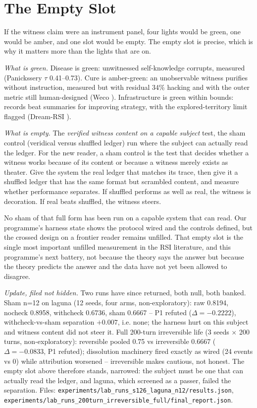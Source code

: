 \section{The Empty Slot}
\label{sec:ch10-empty}

If the witness claim were an instrument panel, four lights would be green, one would be amber, and one slot would be empty. The empty slot is precise, which is why it matters more than the lights that are on.

\textit{What is green.} Disease is green: unwitnessed self-knowledge corrupts, measured (Panickssery $\tau$ 0.41--0.73). Cure is amber-green: an unobservable witness purifies without instruction, measured but with residual 34\% hacking and with the outer metric still human-designed (Weco \cite{weco2026}). Infrastructure is green within bounds: records beat summaries for improving strategy, with the explored-territory limit flagged (Dream-RSI \cite{dreamrsi2026}).

\textit{What is empty.} The \textit{verified witness content on a capable subject} test, the sham control (veridical versus shuffled ledger) run where the subject can actually read the ledger. For the new reader, a sham control is the test that decides whether a witness works because of its content or because a witness merely exists as theater. Give the system the real ledger that matches its trace, then give it a shuffled ledger that has the same format but scrambled content, and measure whether performance separates. If shuffled performs as well as real, the witness is decoration. If real beats shuffled, the witness steers.

No sham of that full form has been run on a capable system that can read. Our programme's harness state shows the protocol wired and the controls defined, but the crossed design on a frontier reader remains unfilled. That empty slot is the single most important unfilled measurement in the RSI literature, and this programme's next battery, not because the theory says the answer but because the theory predicts the answer and the data have not yet been allowed to disagree.

\textit{Update, filed not hidden.} Two runs have since returned, both null, both banked. Sham n=12 on laguna (12 seeds, four arms, non-exploratory): raw 0.8194, nocheck 0.8958, withcheck 0.6736, sham 0.6667 -- P1 refuted ($\Delta=-0.2222$), withcheck-vs-sham separation $+0.007$, i.e. none; the harness hurt on this subject and witness content did not steer it. Full 200-turn irreversible life (3 seeds $\times$ 200 turns, non-exploratory): reversible pooled 0.75 vs irreversible 0.6667 ($\Delta=-0.0833$, P1 refuted); dissolution machinery fired exactly as wired (24 events vs 0) while attribution worsened -- irreversible makes cautious, not honest. The empty slot above therefore stands, narrowed: the subject must be one that can actually read the ledger, and laguna, which screened as a passer, failed the separation. Files: \texttt{experiments/lab\_runs\_s126\_laguna\_n12/results.json}, \texttt{experiments/lab\_runs\_200turn\_irreversible\_full/final\_report.json}.

